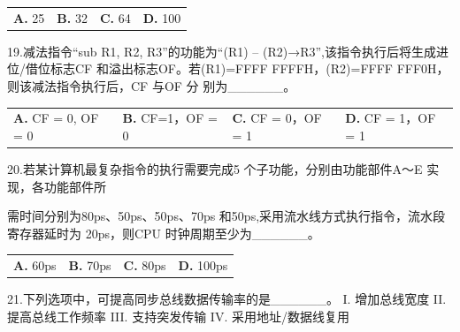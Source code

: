 \documentclass[UTF8,11pt]{ctexart}
\begin{document}
\begin{center}\begin{tabular}{>{\raggedright\arraybackslash}p{\dimexpr(\linewidth-8\tabcolsep)/4\relax}>{\raggedright\arraybackslash}p{\dimexpr(\linewidth-8\tabcolsep)/4\relax}>{\raggedright\arraybackslash}p{\dimexpr(\linewidth-8\tabcolsep)/4\relax}>{\raggedright\arraybackslash}p{\dimexpr(\linewidth-8\tabcolsep)/4\relax}}
\textbf{A.} 25 & \textbf{B.} 32 & \textbf{C.} 64 & \textbf{D.} 100\\[.35em]\end{tabular}\end{center}

19.减法指令“sub R1, R2, R3”的功能为“(R1) – (R2)→R3”,该指令执行后将生成进位/借位标志CF 和溢出标志OF。若(R1)=FFFF FFFFH，(R2)=FFFF FFF0H，则该减法指令执行后，CF 与OF 分 别为\_\_\_\_\_\_。


\begin{center}\begin{tabular}{>{\raggedright\arraybackslash}p{\dimexpr(\linewidth-8\tabcolsep)/4\relax}>{\raggedright\arraybackslash}p{\dimexpr(\linewidth-8\tabcolsep)/4\relax}>{\raggedright\arraybackslash}p{\dimexpr(\linewidth-8\tabcolsep)/4\relax}>{\raggedright\arraybackslash}p{\dimexpr(\linewidth-8\tabcolsep)/4\relax}}
\textbf{A.} CF = 0, OF = 0 & \textbf{B.} CF=1，OF = 0 & \textbf{C.} CF = 0，OF = 1 & \textbf{D.} CF = 1，OF = 1\\[.35em]\end{tabular}\end{center}

20.若某计算机最复杂指令的执行需要完成5 个子功能，分别由功能部件A～E 实现，各功能部件所


需时间分别为80ps、50ps、50ps、70ps 和50ps,采用流水线方式执行指令，流水段寄存器延时为 20ps，则CPU 时钟周期至少为\_\_\_\_\_\_。


\begin{center}\begin{tabular}{>{\raggedright\arraybackslash}p{\dimexpr(\linewidth-8\tabcolsep)/4\relax}>{\raggedright\arraybackslash}p{\dimexpr(\linewidth-8\tabcolsep)/4\relax}>{\raggedright\arraybackslash}p{\dimexpr(\linewidth-8\tabcolsep)/4\relax}>{\raggedright\arraybackslash}p{\dimexpr(\linewidth-8\tabcolsep)/4\relax}}
\textbf{A.} 60ps & \textbf{B.} 70ps & \textbf{C.} 80ps & \textbf{D.} 100ps\\[.35em]\end{tabular}\end{center}

21.下列选项中，可提高同步总线数据传输率的是\_\_\_\_\_\_。 I. 增加总线宽度 II. 提高总线工作频率 III. 支持突发传输 IV. 采用地址/数据线复用
\end{document}
